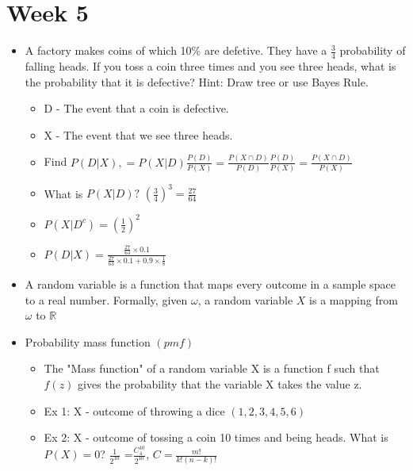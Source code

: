 \documentclass[12pt]{article}
\begin{document}
    \section{Week 5}
    \begin{itemize}
        \item A factory makes coins of which 10\% are defetive.
        They have a $\frac{3}{4}$ probability of falling heads.
        If you toss a coin three times and you see three heads, what is the probability that it is defective?
        Hint: Draw tree or use Bayes Rule.
        \begin{itemize}
            \item D - The event that a coin is defective.
            \item X - The event that we see three heads.
            \item Find $P(D|X), = P(X|D)\frac{P(D)}{P(X)} = \frac{P(X \cap D)}{P(D)} \frac{P(D)}{P(X)} = \frac{P(X \cap D)}{P(X)}$
            \item What is $P(X|D)? $ \guillemotright $(\frac{3}{4})^3 = \frac{27}{64}$
            \item $P(X|D^c) = (\frac{1}{2})^2$
            \item $P(D|X) = \frac{\frac{27}{63} \times 0.1}{\frac{27}{63} \times 0.1 + 0.9 \times \frac{1}{8}}$
        \end{itemize}
        \item A random variable is a function that maps every outcome in a sample space to a real number. Formally, given $\omega$,
        a random variable $X$ is a mapping from $\omega$ to $\mathbb{R}$
        \item Probability mass function $(pmf)$
        \begin{itemize}
            \item The "Mass function" of a random variable X is a function f such that $f(z)$ gives the
            probability that the variable X takes the value z.
            \item Ex 1: X - outcome of throwing a dice $(1,2,3,4,5,6)$
            \item Ex 2: X - outcome of tossing a coin 10 times and being heads. What is $P(X) = 0$? $\frac{1}{2^{10}}$ \newline
            =$\frac{C_4^{10}}{2^{10}}$, $C=\frac{m!}{k!(n-k)!}$
        \end{itemize}
    \end{itemize}
\end{document}
